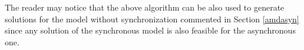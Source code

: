 \bigskip
\noindent
The reader may notice that the above algorithm can be also used to generate solutions for the model without synchronization  commented in Section \ref{amdasyn} since any solution of the synchronous model is also feasible for the asynchronous one. 

